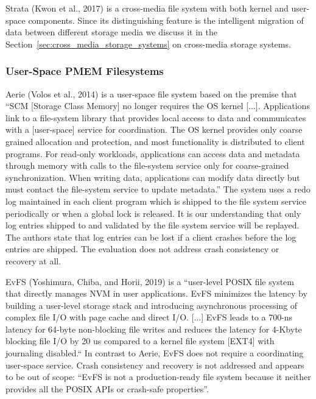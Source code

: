 \documentclass[12pt,a4paper,twoside,draft]{book}
\begin{document}
Strata (Kwon et al., 2017) is a cross-media file system with both kernel and user-space components.
Since its distinguishing feature is the intelligent migration of data between different storage media we discuss it in the Section~\ref{sec:cross_media_storage_systems} on cross-media storage systems.

\subsubsection{User-Space PMEM Filesystems}
\blindtext{}

Aerie (Volos et al., 2014) is a user-space file system based on the premise that
  “SCM [Storage Class Memory] no longer requires the OS kernel [...].
  Applications link to a file-system library that provides local access to data and communicates with a [user-space] service for coordination.
  The OS kernel provides only coarse grained allocation and protection, and most functionality is distributed to client programs.
  For read-only workloads, applications can access data and metadata through memory with calls to the file-system service only for coarse-grained synchronization.
  When writing data, applications can modify data directly but must contact the file-system service to update metadata.”
The system uses a redo log maintained in each client program which is shipped to the file system service periodically or when a global lock is released.
It is our understanding that only log entries shipped to and validated by the file system service will be replayed.
The authors state that log entries can be lost if a client crashes before the log entries are shipped.
The evaluation does not address crash consistency or recovery at all.

EvFS (Yoshimura, Chiba, and Horii, 2019) is a 
  “user-level POSIX file system that directly manages NVM in user applications.
  EvFS minimizes the latency by building a user-level storage stack and introducing asynchronous processing of complex file I/O with page cache and direct I/O.
  [...]
  EvFS leads to a 700-ns latency for 64-byte non-blocking file writes and reduces the latency for 4-Kbyte blocking file I/O by 20 us compared to a kernel file system [EXT4] with journaling disabled.“
In contrast to Aerie, EvFS does not require a coordinating user-space service.
Crash consistency and recovery is not addressed and appears to be out of scope:
  “EvFS is not a production-ready file system because it neither provides all the POSIX APIs or crash-safe properties”.
\end{document}
